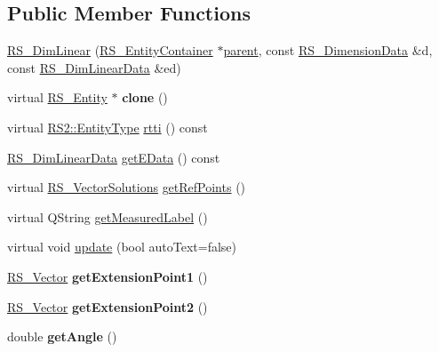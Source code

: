 \subsection*{Public Member Functions}
\begin{DoxyCompactItemize}
\item 
\hyperlink{classRS__DimLinear_a103412d36d0cb73594534b735c3fc31f}{R\-S\-\_\-\-Dim\-Linear} (\hyperlink{classRS__EntityContainer}{R\-S\-\_\-\-Entity\-Container} $\ast$\hyperlink{classRS__Entity_a80358a8d2fc6739a516a278dc500b49f}{parent}, const \hyperlink{classRS__DimensionData}{R\-S\-\_\-\-Dimension\-Data} \&d, const \hyperlink{classRS__DimLinearData}{R\-S\-\_\-\-Dim\-Linear\-Data} \&ed)
\item 
\hypertarget{classRS__DimLinear_a977f372e6e2de7d0cf493244ea890a3e}{virtual \hyperlink{classRS__Entity}{R\-S\-\_\-\-Entity} $\ast$ {\bfseries clone} ()}\label{classRS__DimLinear_a977f372e6e2de7d0cf493244ea890a3e}

\item 
virtual \hyperlink{classRS2_a8f26d1b981e1e85cff16738b43337e6a}{R\-S2\-::\-Entity\-Type} \hyperlink{classRS__DimLinear_a963b94439973b13979054092896fe074}{rtti} () const 
\item 
\hyperlink{classRS__DimLinearData}{R\-S\-\_\-\-Dim\-Linear\-Data} \hyperlink{classRS__DimLinear_afd9a89dcb340d6d109c964d85ea383e4}{get\-E\-Data} () const 
\item 
virtual \hyperlink{classRS__VectorSolutions}{R\-S\-\_\-\-Vector\-Solutions} \hyperlink{classRS__DimLinear_a69aa94330b1085fb54222683ae739197}{get\-Ref\-Points} ()
\item 
virtual Q\-String \hyperlink{classRS__DimLinear_aa44114f68e871ba091771673e98cd2c3}{get\-Measured\-Label} ()
\item 
virtual void \hyperlink{classRS__DimLinear_a8d36067ce429b935630a75ece9b40172}{update} (bool auto\-Text=false)
\item 
\hypertarget{classRS__DimLinear_aadaa738c9ec6aed0dfb7c619682dd5e6}{\hyperlink{classRS__Vector}{R\-S\-\_\-\-Vector} {\bfseries get\-Extension\-Point1} ()}\label{classRS__DimLinear_aadaa738c9ec6aed0dfb7c619682dd5e6}

\item 
\hypertarget{classRS__DimLinear_a214eb07807d75027253e2ce9909b026d}{\hyperlink{classRS__Vector}{R\-S\-\_\-\-Vector} {\bfseries get\-Extension\-Point2} ()}\label{classRS__DimLinear_a214eb07807d75027253e2ce9909b026d}

\item 
\hypertarget{classRS__DimLinear_a7fd36bf2b19b86b6cdb4100849858795}{double {\bfseries get\-Angle} ()}\label{classRS__DimLinear_a7fd36bf2b19b86b6cdb4100849858795}


\end{DoxyCompactItemize}
